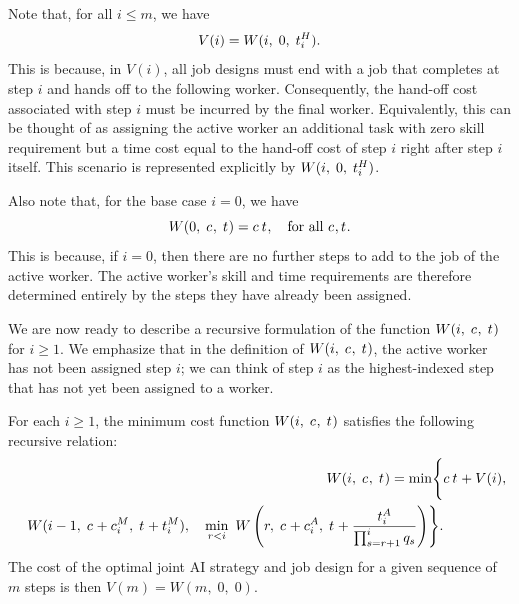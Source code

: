 Note that, for all $i \leq m$, we have 
\[ V(i) = W(i,\; 0,\; t^{H}_{i}). \]
This is because, in $V(i)$, all job designs must end with a job that completes at step $i$ and hands off to the following worker.  
Consequently, the hand-off cost associated with step $i$ must be incurred by the final worker.
Equivalently, this can be thought of as assigning the active worker an additional task with zero skill requirement but a time cost equal to the hand-off cost of step $i$ right after step $i$ itself.
This scenario is represented explicitly by $W(i,\; 0,\; t^{H}_{i})$.

Also note that, for the base case $i=0$, we have 
\[
W(0,\; c_{},\; t_{}) 
= 
c_{}\,t_{}, 
\quad
\text{for all $c_{}, t_{}$}.
\]
This is because, if $i=0$, then there are no further steps to add to the job of the active worker.  
The active worker's skill and time requirements are therefore determined entirely by the steps they have already been assigned.

We are now ready to describe a recursive formulation of the function $W(i,\; c_{},\; t_{})$ for $i \geq 1$.  
We emphasize that in the definition of $W(i,\; c_{},\; t_{})$, the active worker has not been assigned step $i$; we can think of step $i$ as the highest-indexed step that has not yet been assigned to a worker.

\begin{proposition}
\label{prop:recursive_optimality}
For each $i \geq 1$, the minimum cost function $W(i,\; c_{},\; t_{})$ satisfies the following recursive relation:
\begin{align*}
W(i,\; c_{},\; t_{})
= \min\Biggl\{ 
& c_{}\,t_{} + V(i), \\
\quad
W(i-1,\; c_{} + c^{M}_{i},\; t_{} + t^{M}_{i}),
\quad 
\min_{r < i} \ W\left(r,\; c_{} + c^{A}_{i},\; t_{} + \frac{t^{A}_{i}}{\prod_{s=r+1}^{i} q_s}\right)
\Biggr\}.
\end{align*}
The cost of the optimal joint AI strategy and job design for a given sequence of $m$ steps is then $V(m) = W(m,\; 0,\; 0)$.
\end{proposition}

